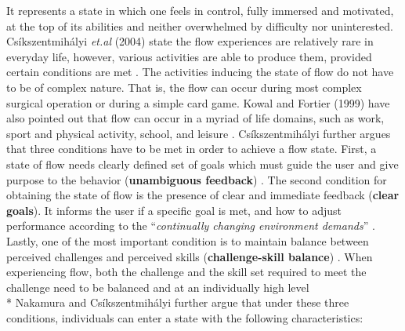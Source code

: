 It represents a state in which one feels in control, fully immersed and motivated, at the top of its abilities and neither overwhelmed by difficulty nor uninterested. Cs\'{i}kszentmih\'{a}lyi \textit{et.al} (2004) state the flow experiences are relatively rare in everyday life, however, various activities are able to produce them, provided certain conditions are met \cite{csikszentmihalyi2014flow}. The activities inducing the state of flow do not have to be of complex nature. That is, the flow can occur during most complex surgical operation or during a simple card game. Kowal and Fortier (1999) have also pointed out that flow can occur in a myriad of life domains, such as work, sport and physical activity, school, and leisure \cite{kowal1999motivational}. Cs\'{i}kszentmih\'{a}lyi further argues that three conditions have to be met in order to achieve a flow state. First, a state of flow needs clearly defined set of goals which must guide the user and give purpose to the behavior (\textbf{unambiguous
feedback}) \cite{csikszentmihalyi2014flow}. The second condition for obtaining the state of flow is the presence  of clear and immediate feedback (\textbf{clear goals}). It informs the user if a specific goal is met, and how to adjust performance according to the ``\textit{continually  changing environment demands}'' \cite{csikszentmihalyi2014flow}. Lastly, one of the most important condition is to maintain balance between perceived challenges and perceived skills (\textbf{challenge-skill balance}) \cite{csikszentmihalyi2014flow}. When experiencing flow, both the challenge and the skill set required to meet the challenge need to be balanced and at an individually high level\\*
Nakamura and Cs\'{i}kszentmih\'{a}lyi  further argue that under these three conditions, individuals can enter a state with the following characteristics: \cite{nakamura2014concept, csikszentmihalyi2014flow}
